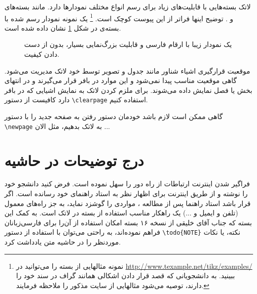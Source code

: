 لاتک بسته‌هایی با قابلیت‌های زیاد برای رسم انواع مختلف نمودارها دارد. مانند بسته‌های  و  . توضیح اینها فراتر از این پیوست کوچک است.
\footnote{
نمونه مثالهایی از بسته  را می‌توانید
 در \url{http://www.texample.net/tikz/examples/} ببینید. به دانشجویانی که قصد قرار دادن اشکالی همانند گراف در سند خود را دارند، توصیه می‌شود مثالهایی از سایت مذکور را ملاحظه فرمایند.}
یک نمونه نمودار رسم شده با بسته‌ی 
 در شکل 
\ref{fig:parabola}
نشان داده شده است.
\begin{figure}[t]
\centering
{}
\caption{یک نمودار زیبا با ارقام فارسی و قابلیت بزرگ‌نمایی بسیار، بدون از دست دادن کیفیت.}
\label{fig:parabola}
\end{figure}
موقعبت قرارگیری اشیاء شناور مانند جدول و تصویر توسط خود لاتک مدیریت می‌شود. گاهی موقعیت مناسب پیدا نمی‌شود و این موارد در بافر قرار می‌گیرند و در انتهای بخش یا فصل نمایش داده می‌شوند. برای ملزم کردن لاتک به نمایش اشیايی که در بافر دارد کافیست از دستور 
\verb!\clearpage!
استفاده کنیم.

 گاهی  ممکن است لازم باشد خودمان دستور رفتن به صفحه جدید را با دستور 
\verb!\newpage!
به لاتک بدهیم، مثل الان ...
\newpage




\section{درج توضیحات در حاشیه}
فراگیر شدن اینترنت ارتباطات از راه دور را سهل نموده است. فرض کنید دانشجو \پ خود را نوشته و از طریق اینترنت برای اظهار نظر به استاد راهنمای خود رسانده است. اگر قرار باشد استاد راهنما پس از مطالعه \پ، مواردی را  گوشزد نماید، به جز راه‌های معمول (تلفن و ایمیل و ...) یک راهکار مناسب استفاده از بسته 
در لاتک است. به کمک این بسته که جناب آقای خلیقی از نسخه ۱۶ بسته
امکان استفاده از آن‌را برای فارسی‌زبانان فراهم نموده‌اند، به راحتی می‌توان با استفاده از دستور
\verb!\todo{NOTE}!
نکته، یا نکات موردنظر  را در حاشیه متن یادداشت کرد.  

